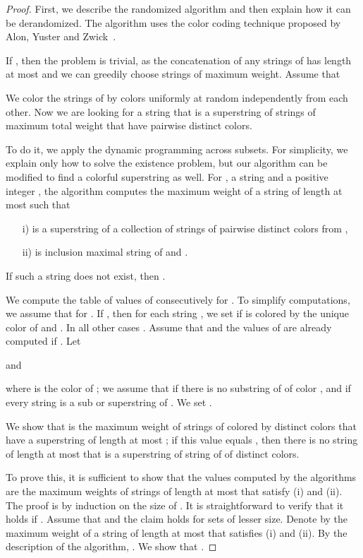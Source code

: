\documentclass[11pt]{article}
\begin{document}
\begin{proof}
First, we describe the randomized algorithm and then explain how it can be derandomized. The algorithm uses the color coding technique proposed by Alon, Yuster and Zwick~\cite{AlonYZ95}. 

If , then the problem is trivial, as the concatenation of any  strings of  has length at most  and we can greedily choose  strings of maximum weight. Assume that 

We color the strings of  by  colors  uniformly at random independently from each other.
Now we are looking for a string  that is a superstring of  strings of maximum total weight that have pairwise distinct colors. 


To do it, we apply the dynamic programming across subsets. 
For simplicity, we explain only how to solve the existence problem, but our algorithm can be modified to find a colorful superstring as well.
For , a string  and a positive integer ,
the algorithm computes the maximum weight  of a string  of length at most  such that
\begin{itemize}
\item[i)]  is a superstring of a collection of  strings  of pairwise distinct colors from , 
\item[ii)]  is inclusion maximal string of  and . 
\end{itemize}
If such a string  does not exist, then .

We compute the table of values of  consecutively for . To simplify computations, we assume that  for .
If , then for each string , we set  if  is colored by the unique color of  and . In all other cases .
Assume that  and the values of  are already computed if . 
Let

and

where  is the color of ; we assume that  if there is no substring  of  of color , and 
  if every string  is a sub or superstring of . 
We set .

We show that  is the maximum weight  of  strings of  colored by distinct colors that have a superstring of length at most ; if this value equals , then there is no string of length at most  that is a superstring of  string of  of distinct colors.

To prove this, it is sufficient to show that the values  computed by the algorithms are the maximum weights of strings of length at most  that satisfy (i) and (ii). The proof is by induction on the size of . It is straightforward to verify that it holds if . Assume that  and the  claim holds for sets of lesser size. 
Denote by   the maximum weight of a string  of length at most  that satisfies (i) and (ii).  
By the description of the algorithm, . We show that  . 


\end{proof}
\end{document}

